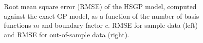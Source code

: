 \documentclass[onecolumn,a4paper,11pt]{article}
\begin{document}
\begin{figure}
\caption{Root mean square error (RMSE) of the HSGP model, computed against the exact GP model, as a function of the number of basis functions $m$ and boundary factor $c$. RMSE for sample data (left) and RMSE for out-of-sample data (right).}
  \label{ch5_fig13_MSE_train_BF_gaydata}
\end{figure}
\end{document}
